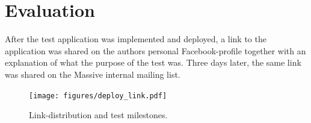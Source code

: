 \documentclass[nofilelist,dvipsnames]{cslthse-msc}
\begin{document}
{%
%
%
%
%
%
%
%
%
	\chapter{Evaluation}

    After the test application was implemented and deployed, a link to the
    application was shared on the authors personal Facebook-profile together
    with an explanation of what the purpose of the test was. Three days
    later, the same link was shared on the Massive internal mailing list.

    \begin{figure}[h!]
      \centering
      \texttt{[image: figures/deploy\_link.pdf]}
      \caption{Link-distribution and test milestones.}
      \label{label_milestones}
    \end{figure}

}
\end{document}
